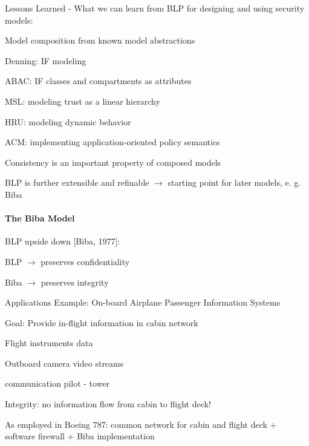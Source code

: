 \documentclass[a4paper]{article}
\begin{document}
\begin{multicols}{3}
    Lessons Learned - What we can learn from BLP for designing and using security models:
    \begin{itemize*}
        \item Model composition from known model abstractions
        \begin{itemize*}
            \item Denning: IF modeling
            \item ABAC: IF classes and compartments as attributes
            \item MSL: modeling trust as a linear hierarchy
            \item HRU: modeling dynamic behavior
            \item ACM: implementing application-oriented policy semantics
        \end{itemize*}
        \item Consistency is an important property of composed models
        \item BLP is further extensible and refinable $\rightarrow$ starting point for later models, e. g. Biba
    \end{itemize*}


    \paragraph{The Biba Model}
    BLP upside down [Biba, 1977]:
    \begin{itemize*}
        \item BLP $\rightarrow$ preserves confidentiality
        \item Biba $\rightarrow$ preserves integrity
    \end{itemize*}

    Applications Example: On-board Airplane Passenger Information Systems
    \begin{itemize*}
        \item Goal: Provide in-flight information in cabin network
        \begin{itemize*}
            \item Flight instruments data
            \item Outboard camera video streams
            \item communication pilot - tower
        \end{itemize*}
        \item Integrity: no information flow from cabin to flight deck!
        \item As employed in Boeing 787: common network for cabin and flight deck + software firewall + Biba implementation
    \end{itemize*}


\end{multicols}
\end{document}
